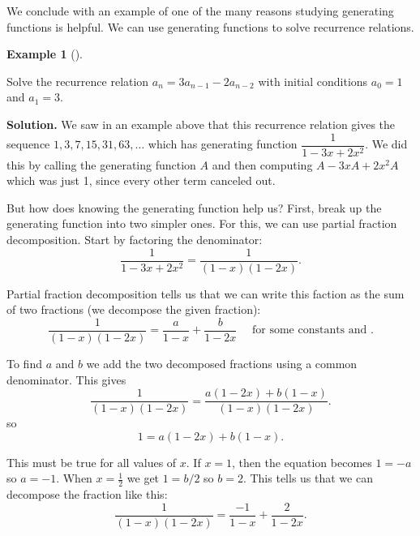 \documentclass[10pt,]{book}
\theoremstyle{plain}
\theoremstyle{definition}
\newtheorem{example}[theorem]{Example}
\theoremstyle{definition}
\theoremstyle{definition}
\numberwithin{equation}{chapter}
\begin{document}
We conclude with an example of one of the many reasons studying generating functions is helpful. We can use generating functions to solve recurrence relations.
%
\begin{example}[]\label{example-114}

Solve the recurrence relation \(a_n = 3a_{n-1} - 2a_{n-2}\) with initial conditions \(a_0 = 1\) and \(a_1 = 3\).
%
\par\medskip\noindent%
\textbf{Solution.}\quad
We saw in an example above that this recurrence relation gives the sequence \(1, 3, 7, 15, 31, 63, \ldots\) which has generating function \(\dfrac{1}{1 - 3x + 2x^2}\). We did this by calling the generating function \(A\) and then computing \(A - 3xA + 2x^2A\) which was just 1, since every other term canceled out.
%
\par

But how does knowing the generating function help us? First, break up the generating function into two simpler ones. For this, we can use partial fraction decomposition. Start by factoring the denominator:
\begin{equation*}
  \frac{1}{1-3x + 2x^2} = \frac{1}{(1-x)(1-2x)}.
\end{equation*}
%
\par

Partial fraction decomposition tells us that we can write this faction as the sum of two fractions (we decompose the given fraction):
\begin{equation*}
  \frac{1}{(1-x)(1-2x)} = \frac{a}{1-x} + \frac{b}{1-2x} \text{ ~~ for some constants  and } .
\end{equation*}
%
\par

To find \(a\) and \(b\) we add the two decomposed fractions using a common denominator. This gives
\begin{equation*}
  \frac{1}{(1-x)(1-2x)} = \frac{a(1-2x) + b(1-x)}{(1-x)(1-2x)}.
\end{equation*}
so
\begin{equation*}
  1 = a(1-2x) + b(1-x).
\end{equation*}
%
\par

This must be true for all values of \(x\). If \(x = 1\), then the equation becomes \(1 = -a\) so \(a = -1\). When \(x = \frac{1}{2}\) we get \(1 = b/2\) so \(b = 2\). This tells us that we can decompose the fraction like this:
\begin{equation*}
  \frac{1}{(1-x)(1-2x)} = \frac{-1}{1-x} + \frac{2}{1-2x}.
\end{equation*}
%
\par


\end{example}
\end{document}
